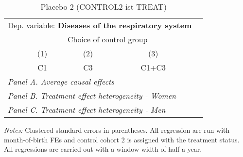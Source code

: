  \begin{table}[H] \centering \begin{threeparttable} \caption{Placebo 2 (CONTROL2 ist TREAT) } {\def\sym#1{\ifmmode^{#1}\else\(^{#1}\)\fi} \begin{tabular}{l*{4}{c}} \toprule \multicolumn{4}{l}{Dep. variable: \textbf{Diseases of the respiratory system}} \\ & \multicolumn{3}{c}{Choice of control group} \\ \cmidrule(lr){2-4}
            &\multicolumn{1}{c}{(1)}&\multicolumn{1}{c}{(2)}&\multicolumn{1}{c}{(3)}\\
            &\multicolumn{1}{c}{C1}&\multicolumn{1}{c}{C3}&\multicolumn{1}{c}{C1+C3}\\
\midrule
 \multicolumn{4}{l}{\emph{Panel A. Average causal effects}} \\      \midrule\multicolumn{4}{l}{\emph{Panel B. Treatment effect heterogeneity - Women}} \\      \midrule\multicolumn{4}{l}{\emph{Panel C. Treatment effect heterogeneity - Men}} \\      
\bottomrule \end{tabular} } \begin{tablenotes} \item \scriptsize \emph{Notes:} Clustered standard errors in parentheses. All regression are run with month-of-birth FEs and control cohort 2 is assigned with the treatment status. All regressions are carried out with a window width of half a year. \end{tablenotes} \end{threeparttable} \end{table} 
